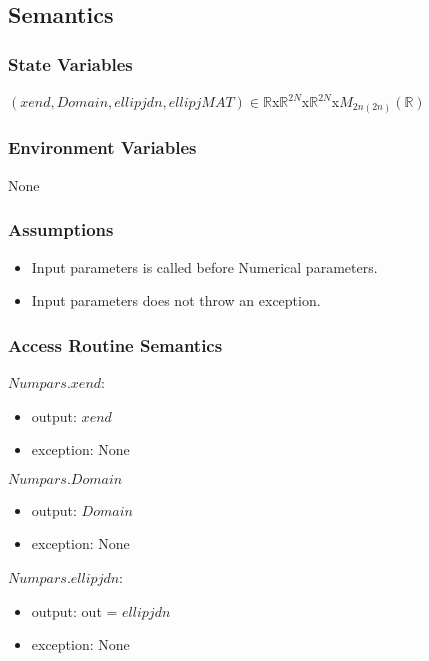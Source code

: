 \documentclass[12pt, titlepage]{article}
\begin{document}
\subsection{Semantics}

\subsubsection{State Variables}

$(xend,Domain,ellipjdn,ellipjMAT) \in 
\mathbb{R}$x$\mathbb{R}^{2N}$x$\mathbb{R}^{2N}$x$M_{2n(2n)}(\mathbb{R})$ 

\subsubsection{Environment Variables}

None

\subsubsection{Assumptions}

\begin{itemize}
	\item Input parameters is called before Numerical parameters. 
	\item Input parameters does not throw an exception. 
\end{itemize}

\subsubsection{Access Routine Semantics}


$Numpars.xend$:
\begin{itemize}
	\item output: $xend$ 
	\item exception: None
\end{itemize}


\noindent $Numpars.Domain$
\begin{itemize} 
	\item output: $Domain$ 
	\item exception: None
\end{itemize} 

\noindent $Numpars.ellipjdn$:
\begin{itemize}
	\item output: out = $ellipjdn$
	\item exception: None 
\end{itemize}
\end{document}
